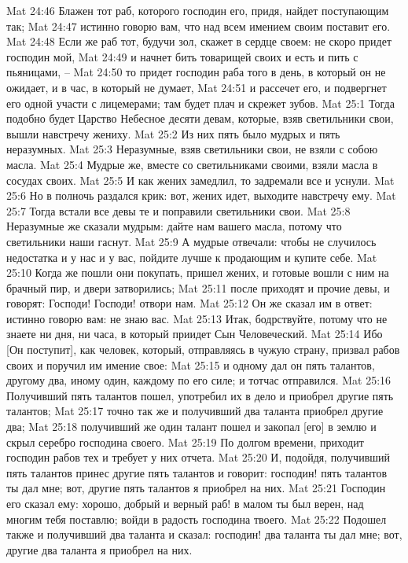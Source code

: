 Mat 24:46  Блажен тот раб, которого господин его, придя, найдет поступающим так;
Mat 24:47  истинно говорю вам, что над всем имением своим поставит его.
Mat 24:48  Если же раб тот, будучи зол, скажет в сердце своем: не скоро придет господин мой,
Mat 24:49  и начнет бить товарищей своих и есть и пить с пьяницами, --
Mat 24:50  то придет господин раба того в день, в который он не ожидает, и в час, в который не думает,
Mat 24:51  и рассечет его, и подвергнет его одной участи с лицемерами; там будет плач и скрежет зубов.
Mat 25:1  Тогда подобно будет Царство Небесное десяти девам, которые, взяв светильники свои, вышли навстречу жениху.
Mat 25:2  Из них пять было мудрых и пять неразумных.
Mat 25:3  Неразумные, взяв светильники свои, не взяли с собою масла.
Mat 25:4  Мудрые же, вместе со светильниками своими, взяли масла в сосудах своих.
Mat 25:5  И как жених замедлил, то задремали все и уснули.
Mat 25:6  Но в полночь раздался крик: вот, жених идет, выходите навстречу ему.
Mat 25:7  Тогда встали все девы те и поправили светильники свои.
Mat 25:8  Неразумные же сказали мудрым: дайте нам вашего масла, потому что светильники наши гаснут.
Mat 25:9  А мудрые отвечали: чтобы не случилось недостатка и у нас и у вас, пойдите лучше к продающим и купите себе.
Mat 25:10  Когда же пошли они покупать, пришел жених, и готовые вошли с ним на брачный пир, и двери затворились;
Mat 25:11  после приходят и прочие девы, и говорят: Господи! Господи! отвори нам.
Mat 25:12  Он же сказал им в ответ: истинно говорю вам: не знаю вас.
Mat 25:13  Итак, бодрствуйте, потому что не знаете ни дня, ни часа, в который приидет Сын Человеческий.
Mat 25:14  Ибо [Он поступит], как человек, который, отправляясь в чужую страну, призвал рабов своих и поручил им имение свое:
Mat 25:15  и одному дал он пять талантов, другому два, иному один, каждому по его силе; и тотчас отправился.
Mat 25:16  Получивший пять талантов пошел, употребил их в дело и приобрел другие пять талантов;
Mat 25:17  точно так же и получивший два таланта приобрел другие два;
Mat 25:18  получивший же один талант пошел и закопал [его] в землю и скрыл серебро господина своего.
Mat 25:19  По долгом времени, приходит господин рабов тех и требует у них отчета.
Mat 25:20  И, подойдя, получивший пять талантов принес другие пять талантов и говорит: господин! пять талантов ты дал мне; вот, другие пять талантов я приобрел на них.
Mat 25:21  Господин его сказал ему: хорошо, добрый и верный раб! в малом ты был верен, над многим тебя поставлю; войди в радость господина твоего.
Mat 25:22  Подошел также и получивший два таланта и сказал: господин! два таланта ты дал мне; вот, другие два таланта я приобрел на них.
